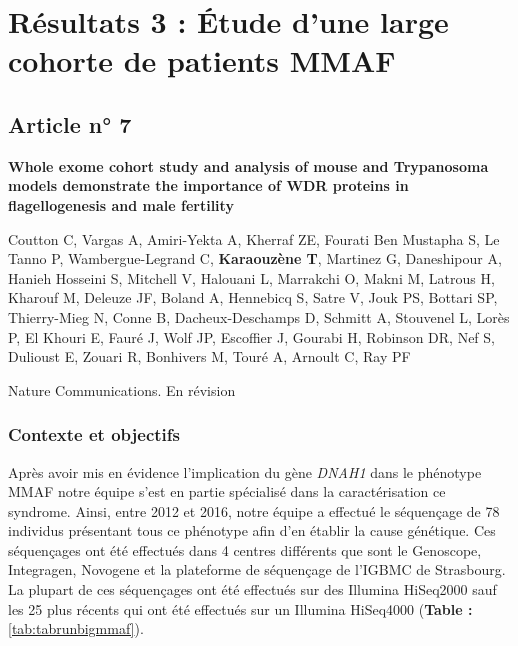 \documentclass[12pt,twoside]{ugathesis}
\begin{document}
\newpage  

\section{Résultats 3 : Étude d'une large cohorte de patients
MMAF}\label{resultats-3-etude-dune-large-cohorte-de-patients-mmaf}

\subsection{Article n° 7}\label{article-n-7}

\textbf{Whole exome cohort study and analysis of mouse and Trypanosoma
models demonstrate the importance of WDR proteins in flagellogenesis and
male fertility}

Coutton C, Vargas A, Amiri-Yekta A, Kherraf ZE, Fourati Ben Mustapha S,
Le Tanno P, Wambergue-Legrand C, \textbf{Karaouzène T}, Martinez G,
Daneshipour A, Hanieh Hosseini S, Mitchell V, Halouani L, Marrakchi O,
Makni M, Latrous H, Kharouf M, Deleuze JF, Boland A, Hennebicq S, Satre
V, Jouk PS, Bottari SP, Thierry-Mieg N, Conne B, Dacheux-Deschamps D,
Schmitt A, Stouvenel L, Lorès P, El Khouri E, Fauré J, Wolf JP,
Escoffier J, Gourabi H, Robinson DR, Nef S, Dulioust E, Zouari R,
Bonhivers M, Touré A, Arnoult C, Ray PF

Nature Communications. En révision

\newpage

\subsubsection{Contexte et objectifs}\label{contexte-et-objectifs-4}

Après avoir mis en évidence l'implication du gène \emph{DNAH1} dans le
phénotype MMAF notre équipe s'est en partie spécialisé dans la
caractérisation ce syndrome. Ainsi, entre 2012 et 2016, notre équipe a
effectué le séquençage de 78 individus présentant tous ce phénotype afin
d'en établir la cause génétique. Ces séquençages ont été effectués dans
4 centres différents que sont le Genoscope, Integragen, Novogene et la
plateforme de séquençage de l'IGBMC de Strasbourg. La plupart de ces
séquençages ont été effectués sur des Illumina HiSeq2000 sauf les 25
plus récents qui ont été effectués sur un Illumina HiSeq4000
(\textbf{Table : }\ref{tab:tabrunbigmmaf}).
\end{document}
